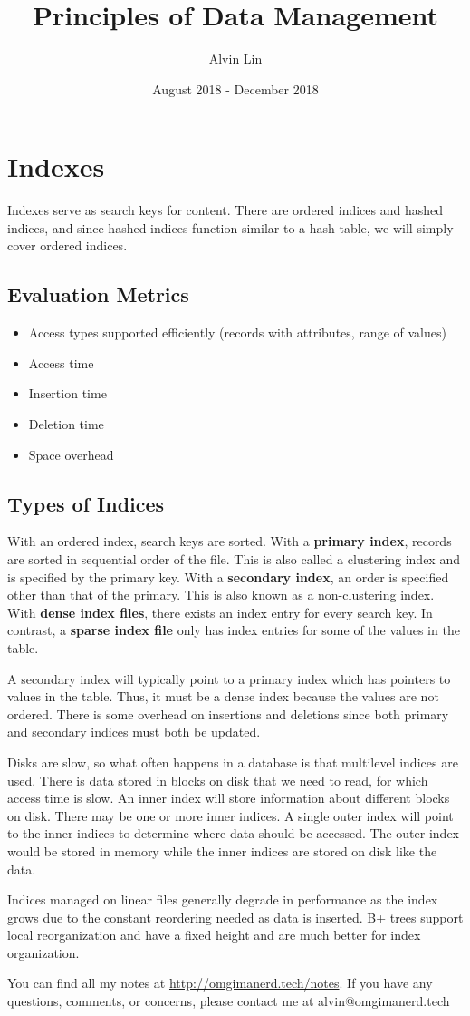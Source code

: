 \documentclass{math}
\title{Principles of Data Management}
\author{Alvin Lin}
\date{August 2018 - December 2018}
\begin{document}
\lstset{basicstyle=\ttfamily\footnotesize,breaklines=true}
\maketitle

\section*{Indexes}
Indexes serve as search keys for content. There are ordered indices and hashed
indices, and since hashed indices function similar to a hash table, we will
simply cover ordered indices.

\subsection*{Evaluation Metrics}
\begin{itemize}
  \item Access types supported efficiently (records with attributes, range of
    values)
  \item Access time
  \item Insertion time
  \item Deletion time
  \item Space overhead
\end{itemize}

\subsection*{Types of Indices}
With an ordered index, search keys are sorted. With a \textbf{primary index},
records are sorted in sequential order of the file. This is also called a
clustering index and is specified by the primary key. With a \textbf{secondary
index}, an order is specified other than that of the primary. This is also
known as a non-clustering index. With \textbf{dense index files}, there exists
an index entry for every search key. In contrast, a \textbf{sparse index file}
only has index entries for some of the values in the table. \par
A secondary index will typically point to a primary index which has pointers to
values in the table. Thus, it must be a dense index because the values are not
ordered. There is some overhead on insertions and deletions since both primary
and secondary indices must both be updated. \par
Disks are slow, so what often happens in a database is that multilevel indices
are used. There is data stored in blocks on disk that we need to read, for
which access time is slow. An inner index will store information about different
blocks on disk. There may be one or more inner indices. A single outer index
will point to the inner indices to determine where data should be accessed.
The outer index would be stored in memory while the inner indices are stored
on disk like the data. \par
Indices managed on linear files generally degrade in performance as the index
grows due to the constant reordering needed as data is inserted. B+ trees
support local reorganization and have a fixed height and are much better for
index organization.

\begin{center}
  You can find all my notes at \url{http://omgimanerd.tech/notes}. If you have
  any questions, comments, or concerns, please contact me at
  alvin@omgimanerd.tech
\end{center}
\end{document}
